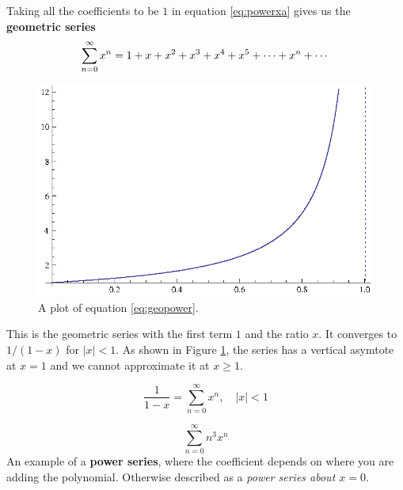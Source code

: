     Taking all the coefficients to be $1$ in equation \eqref{eq:powerxa}
    gives us the \textbf{geometric series}
    \begin{equation}\label{eq:geopower}
      \sum_{n=0}^{\infty} x^n = 1 + x + x^2 + x^3 + x^4 + x^5 + \cdots + x^n  + \cdots
    \end{equation}
    \begin{figure}[H]
      \begin{center}
        \includegraphics{continuous/series/geopower.eps}
      \end{center}
      \caption{A plot of equation \eqref{eq:geopower}.\label{fig:geopower}}
    \end{figure}
    This is the geometric series with the first term $1$ and the ratio $x$.
    It converges to $1/(1-x)$ for $|x|<1.$ As shown in Figure
    \ref{fig:geopower}, the series has a vertical asymtote at $x=1$ and we
    cannot approximate it at $x \geq 1$.
    \begin{theorem}
      \label{th:recipowser}
      \begin{equation}
        \frac{1}{1-x} = \sum_{n=0}^{\infty}x^n, \quad |x| < 1
      \end{equation}
    \end{theorem}
\begin{ex}
  \[ \sum^\infty_{n=0} n^3 x^n   \]
  An example of a \textbf{power series}, where the coefficient depends on where
  you are adding the polynomial.\label{powerseriesex1}
  Otherwise described as a \emph{power series about \(x=0\)}.
\end{ex}
